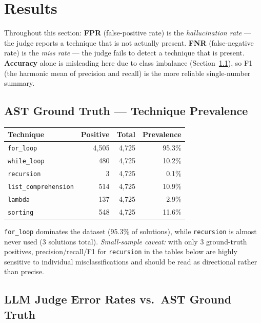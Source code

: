\documentclass{article}
\begin{document}
\section{Results}
\label{sec:results}

Throughout this section: \textbf{FPR} (false-positive rate) is the
\emph{hallucination rate} --- the judge reports a technique that is not
actually present. \textbf{FNR} (false-negative rate) is the \emph{miss rate}
--- the judge fails to detect a technique that is present. \textbf{Accuracy}
alone is misleading here due to class imbalance (Section~\ref{sec:prevalence}),
so F1 (the harmonic mean of precision and recall) is the more reliable
single-number summary.

\subsection{AST Ground Truth --- Technique Prevalence}
\label{sec:prevalence}

\begin{center}
\begin{tabular}{lrrr}
\toprule
\textbf{Technique} & \textbf{Positive} & \textbf{Total} & \textbf{Prevalence} \\
\midrule
\texttt{for\_loop}           & 4{,}505 & 4{,}725 & 95.3\% \\
\texttt{while\_loop}         & 480     & 4{,}725 & 10.2\% \\
\texttt{recursion}           & 3       & 4{,}725 & 0.1\%  \\
\texttt{list\_comprehension} & 514     & 4{,}725 & 10.9\% \\
\texttt{lambda}              & 137     & 4{,}725 & 2.9\%  \\
\texttt{sorting}             & 548     & 4{,}725 & 11.6\% \\
\bottomrule
\end{tabular}
\end{center}

\texttt{for\_loop} dominates the dataset (95.3\% of solutions), while
\texttt{recursion} is almost never used (3 solutions total). \emph{Small-sample
caveat:} with only 3 ground-truth positives, precision/recall/F1 for
\texttt{recursion} in the tables below are highly sensitive to individual
misclassifications and should be read as directional rather than precise.

\subsection{LLM Judge Error Rates vs.\ AST Ground Truth}
\end{document}
